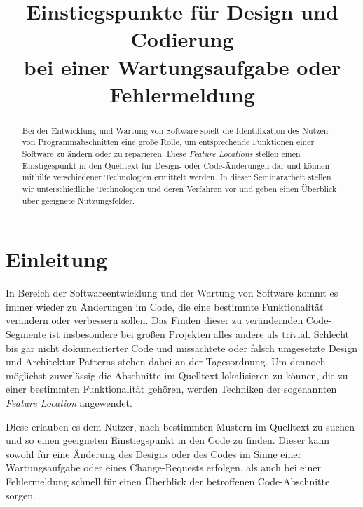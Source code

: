 \documentclass[runningheads,a4paper]{llncs}
\begin{document}
\title{Einstiegspunkte für Design und Codierung \\bei einer Wartungsaufgabe oder Fehlermeldung}


\author{}%

\authorrunning{}%


\maketitle

\begin{abstract}
Bei der Entwicklung und Wartung von Software spielt die Identifikation des Nutzen von Programmabschnitten eine große Rolle, um entsprechende Funktionen einer Software zu ändern oder zu reparieren. Diese \textit{Feature Locations} stellen einen Einstigespunkt in den Quelltext für Design- oder Code-Änderungen dar und können mithilfe verschiedener Technologien ermittelt werden. In dieser Seminararbeit stellen wir unterschiedliche Technologien und deren Verfahren vor und geben einen Überblick über geeignete Nutzungsfelder.
\end{abstract}

\section{Einleitung}

In Bereich der Softwareentwicklung und der Wartung von Software kommt es immer wieder zu Änderungen im Code, die eine bestimmte Funktionalität verändern oder verbessern sollen. Das Finden dieser zu verändernden Code-Segmente ist insbesondere bei großen Projekten alles andere als trivial. Schlecht bis gar nicht dokumentierter Code und missachtete oder falsch umgesetzte Design und Architektur-Patterns stehen dabei an der Tagesordnung. Um dennoch möglichst zuverlässig die Abschnitte im Quelltext lokalisieren zu können, die zu einer bestimmten Funktionalität gehören, werden Techniken der sogenannten \textit{Feature Location} angewendet.

Diese erlauben es dem Nutzer, nach bestimmten Mustern im Quelltext zu suchen und so einen geeigneten Einstiegspunkt in den Code zu finden. Dieser kann sowohl für eine Änderung des Designs oder des Codes im Sinne einer Wartungsaufgabe oder eines Change-Requests erfolgen, als auch bei einer Fehlermeldung schnell für einen Überblick der betroffenen Code-Abschnitte sorgen.
\end{document}
